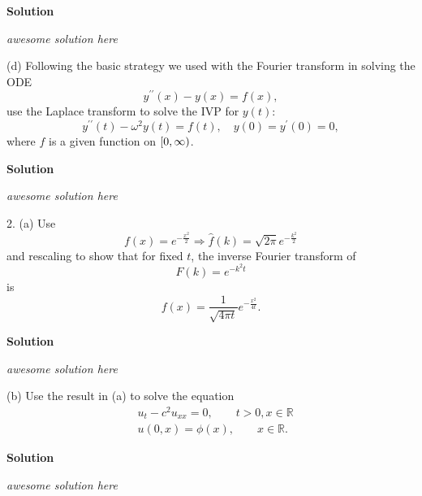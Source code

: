 \documentclass{article}
\begin{document}
\textbf{Solution}

\textit{awesome solution here}

\vspace{5mm}

(d) Following the basic strategy we used with the Fourier transform in
solving the ODE
%
\begin{equation*}
    y^{\prime \prime}(x) - y(x) = f(x)
    ,
\end{equation*}
%
use the Laplace transform to solve the IVP for $y(t)$:
%
\begin{equation*}
    y^{\prime \prime}(t) - \omega^2 y(t) = f(t)
    ,\quad
    y(0) = y^\prime(0) = 0
    ,
\end{equation*}
%
where $f$ is a given function on $\intco{0, \infty}$.

\textbf{Solution}

\textit{awesome solution here}

\newpage

2. (a) Use
%
\begin{equation*}
    f(x) = e^{- \frac{x^2}{2}} \Rightarrow \widehat{f}(k) = \sqrt{2 \pi} e^{- \frac{k^2}{2}}
\end{equation*}
%
and rescaling to show that for fixed $t$, the inverse Fourier transform of
%
\begin{equation*}
    F(k) = e^{- k^2 t}
\end{equation*}
%
is
%
\begin{equation*}
    f(x) = \frac{1}{\sqrt{4 \pi t}} e^{- \frac{x^2}{4 t}}
    .
\end{equation*}

\textbf{Solution}

\textit{awesome solution here}

\vspace{5mm}

(b) Use the result in (a) to solve the equation
%
\begin{align*}
    &u_t - c^2 u_{x x} = 0, \quad \quad t > 0, x \in \mathbb{R} \\
    &u(0, x) = \phi(x), \quad \quad x \in \mathbb{R}
    .
\end{align*}

\textbf{Solution}

\textit{awesome solution here}
\end{document}
